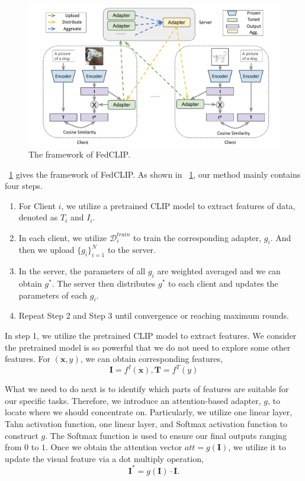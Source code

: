 \documentclass[11pt]{article}
\newcommand{\method}{FedCLIP\xspace}
\newcommand{\wjd}[1]{{\color{cyan}{[(WJD): #1]}}}
\begin{document}
\begin{figure}[t]
	\centering
    \includegraphics[width=.9\textwidth]{submissions/JindongWang/fig/frame.pdf}
	\caption{The framework of \method.} %
	\label{fig:frame1}
\end{figure}

\figurename~\ref{fig:frame1} gives the framework of \method.
As shown in \figurename~\ref{fig:frame1}, our method mainly contains four steps.

\begin{enumerate}
    \item For Client $i$, we utilize a pretrained CLIP model to extract features of data, denoted as $T_i$ and $I_i$.
    \item In each client, we utilize $\mathcal{D}^{train}_i$ to train the corresponding adapter, $g_i$. And then we upload $\{g_i\}_{i=1}^N$ to the server.
    \item In the server, the parameters of all $g_i$ are weighted averaged and we can obtain $g^*$. The server then distributes $g^*$ to each client and updates the parameters of each $g_i$.
    \item Repeat Step 2 and Step 3 until convergence or reaching maximum rounds.
\end{enumerate}

In step 1, we utilize the pretrained CLIP model to extract features. We consider the pretrained model is so powerful that we do not need to explore some other features.
For $(\mathbf{x},y)$, we can obtain corresponding features, %
\begin{equation}
\mathbf{I}=f^I(\mathbf{x}),
\mathbf{T}=f^T(y)
\end{equation}

What we need to do next is to identify which parts of features are suitable for our specific tasks.
Therefore, we introduce an attention-based adapter, $g$, to locate where we should concentrate on.
Particularly, we utilize one linear layer, Tahn activation function, one linear layer, and Softmax activation function to construct $g$.
The Softmax function is used to ensure our final outputs ranging from $0$ to $1$.
Once we obtain the attention vector $att=g(\mathbf{I})$, we utilize it to update the visual feature via a dot multiply operation,
\begin{equation}
    \mathbf{I}^*= g(\mathbf{I})\cdot \mathbf{I}.
\end{equation}
\end{document}
